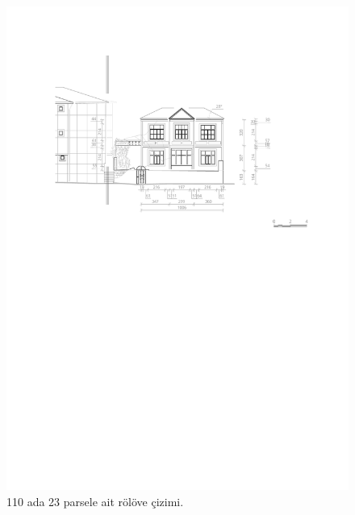 \begin{figure}
\centering
\includegraphics[width=1\textwidth,height=\textheight]{source/figures/Roloveler/R110-23.pdf}
\caption{110 ada 23 parsele ait rölöve çizimi.}
\end{figure}


